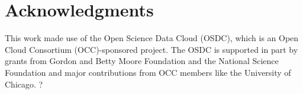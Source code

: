 \documentclass{acm_proc_article-sp}
\begin{document}

\section{Acknowledgments}
This work made use of the Open Science Data Cloud (OSDC), which is an Open Cloud Consortium (OCC)-sponsored project. 
The OSDC is supported in part by grants from Gordon and Betty Moore Foundation and the National Science Foundation and major contributions from OCC members like the University of Chicago. 
?

%

%
%
\end{document}
